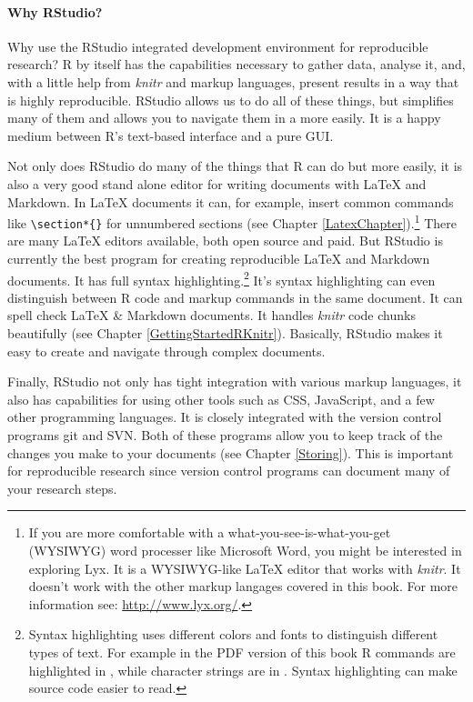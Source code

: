 \paragraph{Why RStudio?}

Why use the RStudio integrated development environment for reproducible research? R by itself has the capabilities necessary to gather data, analyse it, and, with a little help from {\emph{knitr}} and markup languages, present results in a way that is highly reproducible. RStudio allows us to do all of these things, but simplifies many of them and allows you to navigate them in a more easily. It is a happy medium between R's text-based interface and a pure GUI. 

Not only does RStudio do many of the things that R can do but more easily, it is also a very good stand alone editor for writing documents with LaTeX and Markdown. In LaTeX documents it can, for example, insert common commands like \texttt{\textbackslash{}section*\{\}} for unnumbered sections (see Chapter \ref{LatexChapter}).\footnote{If you are more comfortable with a what-you-see-is-what-you-get (WYSIWYG) word processer like Microsoft Word, you might be interested in exploring Lyx. It is a WYSIWYG-like LaTeX editor that works with {\emph{knitr}}. It doesn't work with the other markup langages covered in this book. For more information see: \url{http://www.lyx.org/}.}  There are many LaTeX editors available, both open source and paid. But RStudio is currently the best program for creating reproducible LaTeX and Markdown documents. It has full syntax highlighting.\footnote{Syntax highlighting uses different colors and fonts to distinguish different types of text. For example in the PDF version of this book R commands are highlighted in , while character strings are in . Syntax highlighting can make source code easier to read.} It's syntax highlighting can even distinguish between R code and markup commands in the same document. It can spell check LaTeX \& Markdown documents. It handles {\emph{knitr}} code chunks beautifully (see Chapter \ref{GettingStartedRKnitr}). Basically, RStudio makes it easy to create and navigate through complex documents. 

Finally, RStudio not only has tight integration with various markup languages, it also has capabilities for using other tools such as CSS, JavaScript, and a few other programming languages. It is closely integrated with the version control programs git and SVN. Both of these programs allow you to keep track of the changes you make to your documents (see Chapter \ref{Storing}). This is important for reproducible research since version control programs can document many of your research steps. 

